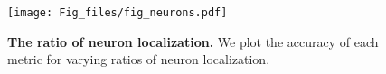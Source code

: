 \begin{figure}[h]
 \centering
  \texttt{[image: Fig\_files/fig\_neurons.pdf]}
  \caption{\textbf{The ratio of neuron localization.} We plot the accuracy of each metric for varying ratios of neuron localization.}
  \vspace{-0.3cm}
  \label{fig:hyper_neuron}
\end{figure}

